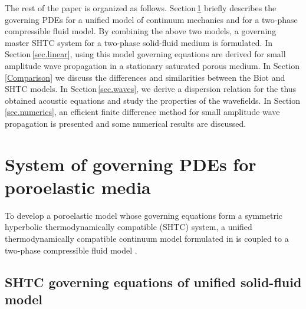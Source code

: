 \documentclass[3p,times,table]{article}
\begin{document}
The rest of the paper is organized as follows. Section\,\ref{sec.theory} 
briefly describes the governing PDEs for a unified model of continuum mechanics 
and for a
two-phase compressible fluid model. By combining the above two  
models, a governing master SHTC system for a two-phase solid-fluid medium is 
formulated.
In Section\,\ref{sec.linear}, using this model governing 
equations are derived for small amplitude wave propagation in a stationary 
saturated porous medium. 
In Section \ref{Comparison} we
discuss the differences and similarities between the Biot and SHTC models.
In Section\,\ref{sec.waves}, we derive a dispersion 
relation for the thus obtained acoustic equations and study the properties of the wavefields. 
In Section\,\ref{sec.numerics}, an efficient finite difference method for 
small amplitude wave propagation is presented and some numerical results are 
discussed.         




%


\section{System of governing PDEs for poroelastic media}\label{sec.theory}

To develop a poroelastic model whose governing equations form a symmetric 
hyperbolic thermodynamically compatible (SHTC) system, a unified thermodynamically compatible continuum model formulated in 
\cite{HPR2016,DPRZ2016} is coupled to a
two-phase compressible fluid model \cite{RomDrikToro2010}. 

\subsection{SHTC governing equations of unified solid-fluid 
model}\label{sec.GPR}
\end{document}
